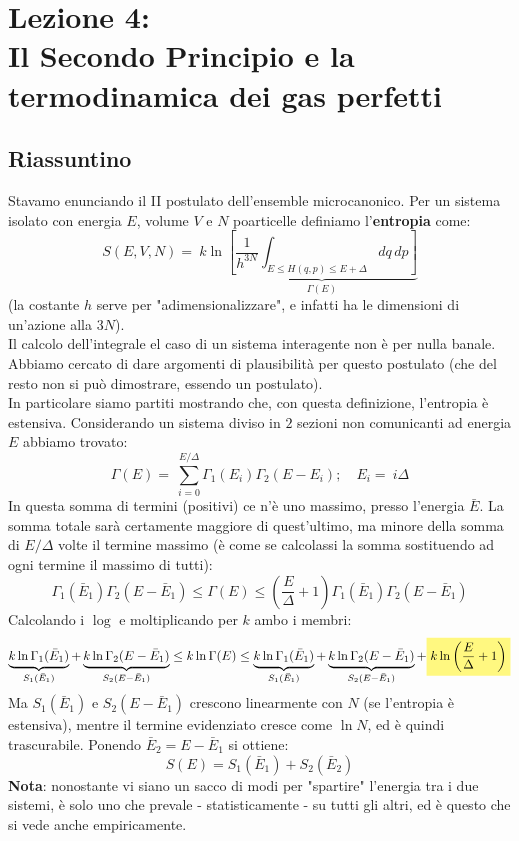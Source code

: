 \documentclass[../MeccanicaStatistica.tex]{subfiles}
\begin{document}
\section{Lezione 4:\\ \large{Il Secondo Principio e la termodinamica dei gas perfetti}}
\subsection{Riassuntino}
Stavamo enunciando il II postulato dell'ensemble microcanonico. Per un sistema isolato con energia $E$, volume $V$ e $N$ poarticelle definiamo l'\textbf{entropia} come:
\[
S(E,V,N) =\ k\ln\underbrace{\left[\frac{1}{h^{3N}}\int_{E\leq H(q,p)\leq E+\Delta}dq\,dp\right]}_{\Gamma(E)}
\]
(la costante $h$ serve per "adimensionalizzare", e infatti ha le dimensioni di un'azione alla $3N$).\\
Il calcolo dell'integrale el caso di un sistema interagente non è per nulla banale.\\
Abbiamo cercato di dare argomenti di plausibilità per questo postulato (che del resto non si può dimostrare, essendo un postulato).\\
In particolare siamo partiti mostrando che, con questa definizione, l'entropia è estensiva. Considerando un sistema diviso in $2$ sezioni non comunicanti ad energia $E$ abbiamo trovato:
\[
\Gamma(E) =\ \sum_{i=0}^{E/\Delta} \Gamma_1(E_i)\Gamma_2(E-E_i); \quad E_i =\ i\Delta
\]
In questa somma di termini (positivi) ce n'è uno massimo, presso l'energia $\bar{E}$. La somma totale sarà certamente maggiore di quest'ultimo, ma minore della somma di $E/\Delta$ volte il termine massimo (è come se calcolassi la somma sostituendo ad ogni termine il massimo di tutti):
\[
\Gamma_1(\bar{E}_1)\Gamma_2(E-\bar{E}_1)\leq \Gamma(E)\leq \left(\frac{E}{\Delta}+1\right )\Gamma_1(\bar{E}_1)\Gamma_2(E-\bar{E}_1)
\]
Calcolando i $\log$ e moltiplicando per $k$ ambo i membri:
\[
\underbrace{k\ln\Gamma_1(\bar{E}_1)}_{S_1(\bar{E}_1)}+\underbrace{k\ln\Gamma_2(E-\bar{E}_1)}_{S_2(E-\bar{E}_1)}\leq k\ln\Gamma(E)\leq \underbrace{k\ln\Gamma_1(\bar{E}_1)}_{S_1(\bar{E}_1)}+\underbrace{k\ln\Gamma_2(E-\bar{E}_1)}_{S_2(E-\bar{E}_1)} + \hlc{Yellow}{k\ln\left(\frac{E}{\Delta}+1\right)}
\]
Ma $S_1(\bar{E}_1)$ e $S_2(E-\bar{E}_1)$ crescono linearmente con $N$ (se l'entropia è estensiva), mentre il termine evidenziato cresce come $\ln N$, ed è quindi trascurabile. Ponendo $\bar{E}_2 = E-\bar{E}_1$ si ottiene:
\[
S(E) = S_1(\bar{E}_1)+S_2(\bar{E}_2)
\]
\textbf{Nota}: nonostante vi siano un sacco di modi per "spartire" l'energia tra i due sistemi, è solo uno che prevale - statisticamente - su tutti gli altri, ed è questo che si vede anche empiricamente.\\
\end{document}
